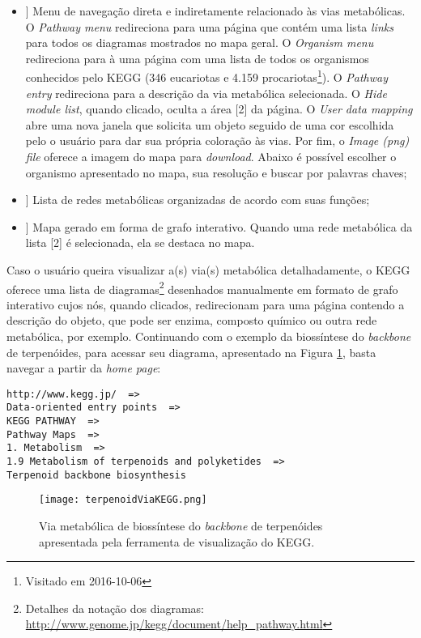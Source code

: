 \begin{itemize}
\item[[ 1]] Menu de navegação direta e indiretamente relacionado às vias metabólicas. O \textit{Pathway menu} redireciona para uma página que contém uma lista \textit{links} para todos os diagramas mostrados no mapa geral. O \textit{Organism menu} redireciona para à uma página com uma lista de todos os organismos conhecidos pelo KEGG (346 eucariotas e 4.159 procariotas\footnote{Visitado em 2016-10-06}). O \textit{Pathway entry} redireciona para a descrição da via metabólica selecionada. O \textit{Hide module list}, quando clicado, oculta a área [2] da página. O \textit{User data mapping} abre uma nova janela que solicita um objeto seguido de uma cor escolhida pelo o usuário para dar sua própria coloração às vias. Por fim, o \textit{Image (png) file} oferece a imagem do mapa para \textit{download}. Abaixo é possível escolher o organismo apresentado no mapa, sua resolução e buscar por palavras chaves;
\item[[ 2]] Lista de redes metabólicas organizadas de acordo com suas funções;
\item[[ 3]] Mapa gerado em forma de grafo interativo. Quando uma rede metabólica da lista [2] é selecionada, ela se destaca no mapa.
\end{itemize}

\indent Caso o usuário queira visualizar a(s) via(s) metabólica detalhadamente, o KEGG oferece uma lista de diagramas\footnote{Detalhes da notação dos diagramas: \url{http://www.genome.jp/kegg/document/help_pathway.html}} desenhados manualmente em formato de grafo interativo cujos nós, quando clicados, redirecionam para uma página contendo a descrição do objeto, que pode ser enzima, composto químico ou outra rede metabólica, por exemplo. Continuando com o exemplo da biossíntese do \textit{backbone} de terpenóides, para acessar seu diagrama, apresentado na Figura \ref{terpenoidBackboneKEGG}, basta navegar a partir da \textit{home page}:

\begin{lstlisting}
http://www.kegg.jp/  =>
Data-oriented entry points  =>
KEGG PATHWAY  =>
Pathway Maps  =>
1. Metabolism  =>
1.9 Metabolism of terpenoids and polyketides  =>
Terpenoid backbone biosynthesis
\end{lstlisting}

\newpage

\begin{figure}[!h]
\centering
\texttt{[image: terpenoidViaKEGG.png]}
\caption{Via metabólica de biossíntese do \textit{backbone} de terpenóides apresentada pela ferramenta de visualização do KEGG.}
\label{terpenoidBackboneKEGG}
\end{figure}

